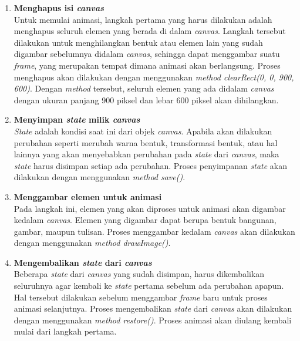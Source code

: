 \begin{enumerate}
	\begin{enumerate}
		\item \textbf{Menghapus isi \textit{canvas}} \\
		Untuk memulai animasi, langkah pertama yang harus dilakukan adalah menghapus seluruh elemen yang berada di dalam \textit{canvas}. Langkah tersebut dilakukan untuk menghilangkan bentuk atau elemen lain yang sudah digambar sebelumnya didalam \textit{canvas}, sehingga dapat menggambar suatu \textit{frame}, yang merupakan tempat dimana animasi akan berlangsung. Proses menghapus akan dilakukan dengan menggunakan \textit{method clearRect(0, 0, 900, 600)}. Dengan \textit{method} tersebut, seluruh elemen yang ada didalam \textit{canvas} dengan ukuran panjang 900 piksel dan lebar 600 piksel akan dihilangkan.
		
		\item \textbf{Menyimpan \textit{state} milik \textit{canvas}} \\
		\textit{State} adalah kondisi saat ini dari objek \textit{canvas}. Apabila akan dilakukan perubahan seperti merubah warna bentuk, transformasi bentuk, atau hal lainnya yang akan menyebabkan perubahan pada \textit{state} dari \textit{canvas}, maka \textit{state} harus disimpan setiap ada perubahan. Proses penyimpanan \textit{state} akan dilakukan dengan menggunakan \textit{method save()}.
		
		\item \textbf{Menggambar elemen untuk animasi} \\
		Pada langkah ini, elemen yang akan diproses untuk animasi akan digambar kedalam \textit{canvas}. Elemen yang digambar dapat berupa bentuk bangunan, gambar, maupun tulisan. Proses menggambar kedalam \textit{canvas} akan dilakukan dengan menggunakan \textit{method drawImage()}.
		
		\item \textbf{Mengembalikan \textit{state} dari \textit{canvas}} \\
		Beberapa \textit{state} dari \textit{canvas} yang sudah disimpan, harus dikembalikan seluruhnya agar kembali ke \textit{state} pertama sebelum ada perubahan apapun. Hal tersebut dilakukan sebelum menggambar \textit{frame} baru untuk proses animasi selanjutnya. Proses mengembalikan \textit{state} dari \textit{canvas} akan dilakukan dengan menggunakan \textit{method restore()}. Proses animasi akan diulang kembali mulai dari langkah pertama.
	\end{enumerate}
	

\end{enumerate}
